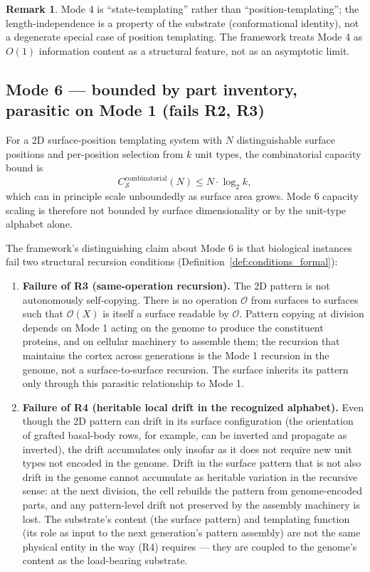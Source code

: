 \documentclass[11pt]{article}
\theoremstyle{plain}
\theoremstyle{definition}
\newtheorem{remark}[theorem]{Remark}
\newcommand{\Csub}{C_{\mathcal{S}}}
\newcommand{\Op}{\mathcal{O}}
\begin{document}
\begin{remark}
Mode 4 is ``state-templating'' rather than ``position-templating''; the length-independence is a property of the substrate (conformational identity), not a degenerate special case of position templating. The framework treats Mode 4 as $O(1)$ information content as a structural feature, not as an asymptotic limit.
\end{remark}

\subsection{Mode 6 --- bounded by part inventory, parasitic on Mode 1 (fails R2, R3)}
\label{sec:mode6}

For a 2D surface-position templating system with $N$ distinguishable surface positions and per-position selection from $k$ unit types, the combinatorial capacity bound is
\[
\Csub^{\mathrm{combinatorial}}(N) \le N \cdot \log_2 k,
\]
which can in principle scale unboundedly as surface area grows. Mode 6 capacity scaling is therefore not bounded by surface dimensionality or by the unit-type alphabet alone.

The framework's distinguishing claim about Mode 6 is that biological instances fail two structural recursion conditions (Definition~\ref{def:conditions_formal}):

\begin{enumerate}
  \item \textbf{Failure of R3 (same-operation recursion).} The 2D pattern is not autonomously self-copying. There is no operation $\Op$ from surfaces to surfaces such that $\Op(X)$ is itself a surface readable by $\Op$. Pattern copying at division depends on Mode 1 acting on the genome to produce the constituent proteins, and on cellular machinery to assemble them; the recursion that maintains the cortex across generations is the Mode 1 recursion in the genome, not a surface-to-surface recursion. The surface inherits its pattern only through this parasitic relationship to Mode 1.
  \item \textbf{Failure of R4 (heritable local drift in the recognized alphabet).} Even though the 2D pattern can drift in its surface configuration (the orientation of grafted basal-body rows, for example, can be inverted and propagate as inverted), the drift accumulates only insofar as it does not require new unit types not encoded in the genome. Drift in the surface pattern that is not also drift in the genome cannot accumulate as heritable variation in the recursive sense: at the next division, the cell rebuilds the pattern from genome-encoded parts, and any pattern-level drift not preserved by the assembly machinery is lost. The substrate's content (the surface pattern) and templating function (its role as input to the next generation's pattern assembly) are not the same physical entity in the way (R4) requires --- they are coupled to the genome's content as the load-bearing substrate.
\end{enumerate}
\end{document}
